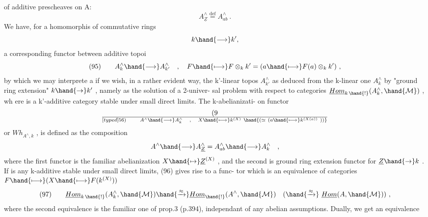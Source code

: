 
of additive prescheaves on A:
\[ A^{\wedge}_{\underline{Z}} \overset{\mathrm{def}}{=} A^{\wedge}_{ab} \ . \]
We have,  for a  homomorphis of commutative rings
\[ k \hand{\longrightarrow} k' , \]
a corresponding functor between additive topoi
\[ (95) \qquad A^{\wedge}_{k} \hand{\longrightarrow} A^{\wedge}_{k'} \quad , \quad F \hand{\longmapsto} F\otimes_{k} k' = ( a \hand{\longmapsto} F(a)\otimes_{k} k' ) \ , \]
by which we may interprete a if we wish,  in a rather evident way,
the  k'-linear topos $A^{\wedge}_{k'}$ as deduced from the k-linear one $A^{\wedge}_{k}$
by "ground ring extension" $k \hand{\to} k'$ ,  namely as the solution of a 2-univer-%
sal problem with respect to categories $\underline{Hom}_{k\,\hand{!}}(A^{\wedge}_{k} , \hand{\mathcal{M}})$ ,  wh ere  is a
k'-additive category stable under small direct limits.  The k-abelianizati-%
on functor
\[ (9\over[typed]{5}{6}) \qquad A^{\wedge} \hand{\longrightarrow} A^{\wedge}_{k} \quad , \quad X \hand{\longmapsto} k^{(X)} \ \hand{(\simeq\ (a \hand{\longmapsto} k^{(X(a))}\ ))} \]
or  $Wh_{A^{\wedge},k}$ ,  is defined as the composition
\[ A^{\wedge} \hand{\longrightarrow} A^{\wedge}_{\underline{Z}} = A^{\wedge}_{ab} \hand{\longrightarrow} A^{\wedge}_{k} \quad , \]
where the first functor is the familiar abelianization  $X \hand{\mapsto} \underline{Z}^{(X)}$ ,  and
the second is  ground ring extension functor for $\underline{Z} \hand{\to} k$ .  If  is any
k-additive  stable under small direct limits,  (96)  gives rise to a func-%
tor which is an equivalence of categories  $F \hand{\longmapsto} (X \hand{\longmapsto} F(k^{(X)}))$
\[ (97) \qquad \underline{Hom}_{k\,\hand{!}}(A^{\wedge}_{k} , \hand{\mathcal{M}}) \hand{\xrightarrow{\approx}} \underline{Hom}_{\hand{!}}(A^{\wedge} , \hand{\mathcal{M}}) \quad ( \hand{\xrightarrow{\approx}} \ \underline{Hom}(A, \hand{\mathcal{M}}) ) \ , \]
where the second equivalence is the familiar one of  prop.3 (p.394),
independant of any abelian assumptions.  Dually,  we get an equivalence

